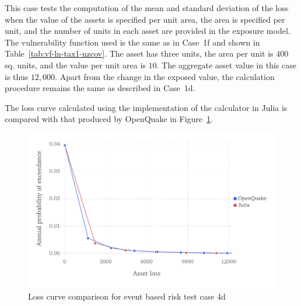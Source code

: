 This case tests the computation of the mean and standard deviation of the loss when the value of the assets is specified per unit area, the area is specified per unit, and the number of units in each asset are provided in the exposure model. The vulnerability function used is the same as in Case~1f and shown in Table~\ref{tab:vf-ln-tax1-nzcov}. The asset has three units, the area per unit is $400$ sq. units, and the value per unit area is $10$. The aggregate asset value in this case is thus $12,000$. Apart from the change in the exposed value, the calculation procedure remains the same as described in Case~1d.

The loss curve calculated using the implementation of the calculator in Julia is compared with that produced by OpenQuake in Figure~\ref{fig:lc-ebr-4d}.

\begin{figure}[htbp]
\centering
\includegraphics[width=12cm]{qareport/figures/fig-lc-ebr-4d}
\caption{Loss curve comparison for event based risk test case 4d}
\label{fig:lc-ebr-4d}
\end{figure}